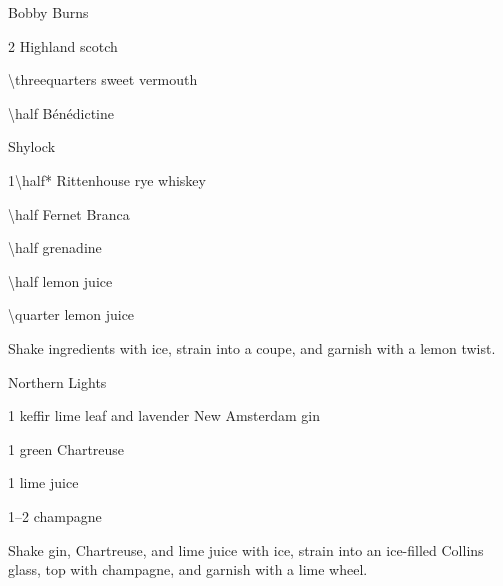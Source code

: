 \begin{Cocktail}{Bobby Burns}
	\begin{Ingredients}
	\item \SI{2}{\oz} Highland scotch
	\item \SI{\threequarters}{\oz} sweet vermouth
	\item \SI{\half}{\oz} B\'en\'edictine
	\end{Ingredients}
\end{Cocktail}

\begin{Cocktail*}{Shylock} %
	\begin{Ingredients}
	\item \SI{1\half*}{\oz} Rittenhouse rye whiskey
	\item \SI{\half}{\oz} Fernet Branca
	\item \SI{\half}{\oz} grenadine
	\item \SI{\half}{\oz} lemon juice
	\item \SI{\quarter}{\oz} lemon juice
	\end{Ingredients}
	
	\begin{Instructions}
	Shake ingredients with ice, strain into a coupe, and garnish with a lemon twist.
	\end{Instructions}
	\FantabulonAvalanche
\end{Cocktail*}

\begin{Cocktail*}{Northern Lights}
	\begin{Ingredients}
	\item \SI{1}{\oz} keffir lime leaf and lavender New Amsterdam gin
	\item \SI{1}{\oz} green Chartreuse
	\item \SI{1}{\oz} lime juice
	\item \SIrange{1}{2}{\oz} champagne
	\end{Ingredients}
	
	\begin{Instructions}
	Shake gin, Chartreuse, and lime juice with ice, strain into an ice-filled Collins glass, top with champagne, and garnish with a lime wheel.
	\end{Instructions}
	\FantabulonAvalanche
\end{Cocktail*}

